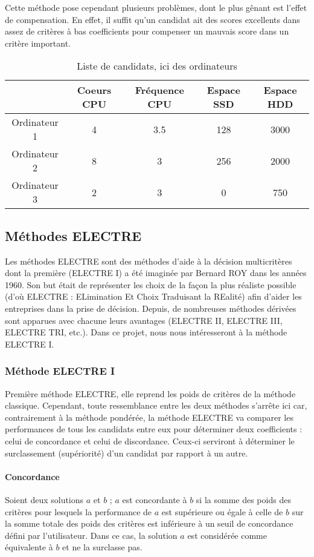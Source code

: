 \documentclass[a4paper]{article}
\begin{document}
Cette méthode pose cependant plusieurs problèmes, dont le plus gênant est l'effet de compensation. En effet, il suffit qu'un candidat ait des scores excellents dans assez de critères à bas coefficients pour compenser un mauvais score dans un critère important.

\begin{table}[!ht]
\begin{tabular}{|c|c|c|c|c|}
  \hline
  \hphantom & Coeurs CPU & Fréquence CPU & Espace SSD &  Espace HDD \\
  \hline
  Ordinateur 1 & 4 & 3.5 & 128 & 3000 \\
  Ordinateur 2 & 8 & 3 & 256 &	2000 \\
  Ordinateur 3 & 2 & 3 & 0 & 750 \\
  \hline
\end{tabular}
\caption{Liste de candidats, ici des ordinateurs}
\end{table}

\newpage

\subsection{Méthodes ELECTRE}

Les méthodes ELECTRE sont des méthodes d'aide à la décision multicritères dont la première (ELECTRE I) a été imaginée par Bernard ROY dans les années 1960. Son but était de représenter les choix de la façon la plus réaliste possible (d'où ELECTRE : ELimination Et Choix Traduisant la REalité) afin d'aider les entreprises dans la prise de décision. Depuis, de nombreuses méthodes dérivées sont apparues avec chacune leurs avantages (ELECTRE II, ELECTRE III, ELECTRE TRI, etc.). Dans ce projet, nous nous intéresseront à la méthode ELECTRE I.

\subsubsection{Méthode ELECTRE I}

Première méthode ELECTRE, elle reprend les poids de critères de la méthode classique. Cependant, toute ressemblance entre les deux méthodes s'arrête ici car, contrairement à la méthode pondérée, la méthode ELECTRE va comparer les performances de tous les candidats entre eux pour déterminer deux coefficients : celui de concordance et celui de discordance. Ceux-ci serviront à déterminer le surclassement (supériorité) d'un candidat par rapport à un autre.

\paragraph{Concordance}
Soient deux solutions \(a\) et \(b\) ; \(a\) est concordante à \(b\) si la somme des poids des critères pour lesquels la performance de \(a\) est supérieure ou égale à celle de \(b\) sur la somme totale des poids des critères est inférieure à un seuil de concordance défini par l'utilisateur. Dans ce cas, la solution \(a\) est considérée comme équivalente à \(b\) et ne la surclasse pas.
\end{document}
